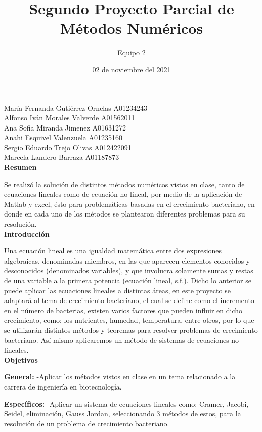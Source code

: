 \documentclass[12pt,a4paper]{article}
\begin{document}
	\title{Segundo Proyecto Parcial de Métodos Numéricos}
	\author{Equipo 2}
	\date{02 de noviembre del 2021}
	\maketitle

María Fernanda Gutiérrez Ornelas 	A01234243\\
Alfonso Iván Morales Valverde	    A01562011\\
Ana Sofia Miranda Jimenez          A01631272\\
Anahi Esquivel Valenzuela          A01235160\\
Sergio Eduardo Trejo Olivas 	    A012422091\\
Marcela Landero Barraza                  A01187873\\

\textbf{Resumen}

Se realizó la solución de distintos métodos numéricos vistos en clase, tanto de ecuaciones lineales como de ecuación no lineal, por medio de la aplicación de Matlab y excel, ésto para problemáticas basadas en el crecimiento bacteriano, en donde en cada uno de los métodos se plantearon  diferentes problemas para su resolución.\\ 

\textbf{Introducción}

Una ecuación lineal es una igualdad matemática entre dos expresiones algebraicas, denominadas miembros, en las que aparecen elementos conocidos y desconocidos (denominados variables), y que involucra solamente sumas y restas de una variable a la primera potencia (ecuación lineal, s.f.). Dicho lo anterior se puede aplicar las ecuaciones lineales a distintas áreas, en este proyecto se adaptará al tema de crecimiento bacteriano, el cual se define como el incremento en el número de bacterias, existen varios factores que pueden influir en dicho crecimiento, como: los nutrientes, humedad, temperatura, entre otros, por lo que se utilizarán distintos métodos y teoremas para resolver problemas de crecimiento bacteriano. Así mismo aplicaremos un método de sistemas de ecuaciones no lineales.\\ 

\textbf{Objetivos}

\textbf{General:}
-Aplicar los métodos vistos en clase en un tema relacionado a la carrera de ingeniería en biotecnología. 

\textbf{Específicos:}
-Aplicar un sistema de ecuaciones lineales como: Cramer, Jacobi, Seidel, eliminación, Gauss Jordan, seleccionando 3 métodos de estos, para la resolución de un problema de crecimiento bacteriano.
\end{document}
